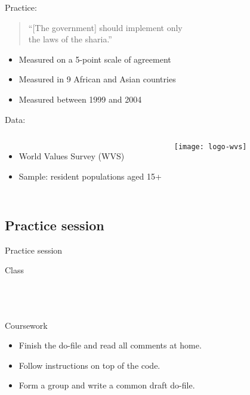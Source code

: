 \documentclass[t]{beamer}
\begin{document}
	\begin{frame}[t]{Practice: }

		\begin{quote}
		``[The government] should implement only \\
		the laws of the sharia.''\\[1em]
		\end{quote}
		
		\begin{itemize}
			\item Measured on a 5-point scale of agreement
			\item Measured in 9 African and Asian countries
			\item Measured between 1999 and 2004
		\end{itemize}

		\vspace{1em}
		
    Data:
	
			\begin{columns}[c]
				
				\begin{itemize}
					\item World Values Survey (WVS)
					\item Sample: resident populations aged 15+
				\end{itemize}
	
				\texttt{[image: logo-wvs]}
			\end{columns}
	
	\end{frame}

	\subsection{Practice session}
  
	\begin{frame}[t]{Practice session}

    \begin{block}{Class}
      \\
      \\
      
			\\
			\\    
    \end{block}

    \begin{alertblock}{Coursework}
      \begin{itemize}
	       \item Finish the do-file and read all comments at home.
	       \item Follow instructions on top of the code.
	       \item Form a group and write a common draft do-file.
      \end{itemize}
    \end{alertblock}
    		
	\end{frame}
  
\end{document}

